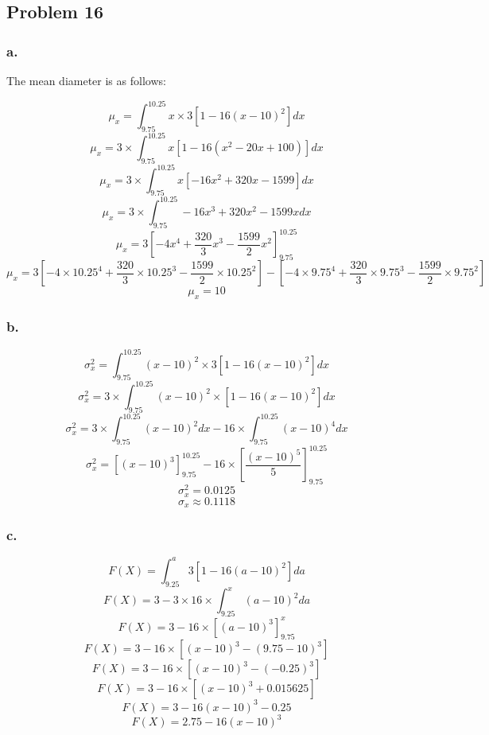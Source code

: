 \documentclass[11pt]{article}
\begin{document}
\subsection{Problem 16}
\subsubsection{a.}
The mean diameter is as follows:

\[ \mu_x = \int_{9.75}^{10.25}x \times 3\left[ 1 - 16{\left( x - 10 \right)}^2 \right]dx \]
\[ \mu_x = 3 \times \int_{9.75}^{10.25}x \left[ 1 - 16 \left(x^2 - 20x + 100 \right) \right]dx \]
\[ \mu_x = 3 \times \int_{9.75}^{10.25}x \left[ - 16x^2 + 320x - 1599 \right]dx \]
\[ \mu_x = 3 \times \int_{9.75}^{10.25}-16x^3 + 320x^2 - 1599x dx \]
\[ \mu_x = 3 {\left[ -4x^4 + \frac{320}{3}x^3 - \frac{1599}{2} x^2 \right]}^{10.25}_{9.75} \] 
\[ \mu_x = 3 \left[ -4\times 10.25^4 + \frac{320}{3}\times 10.25^3 - \frac{1599}{2} \times 10.25^2 \right] -
             \left[ -4\times 9.75^4 + \frac{320}{3}\times 9.75^3 - \frac{1599}{2} \times 9.75^2 \right]\] 
\[ \mu_x = 10 \]

\subsubsection{b.}
\[ \sigma_x^2 = \int_{9.75}^{10.25} {(x - 10)}^2 \times 3\left[ 1 - 16{(x - 10)}^2 \right]dx \]
\[ \sigma_x^2 = 3 \times \int_{9.75}^{10.25} {(x - 10)}^2 \times \left[ 1 - 16{(x - 10)}^2 \right]dx \]
\[ \sigma_x^2 = 3 \times \int_{9.75}^{10.25} {(x - 10)}^2 dx  - 16\times\int_{9.75}^{10.25} {(x - 10)}^4  dx \]
\[ \sigma_x^2 = {\left[ {(x-10)}^3 \right]}^{10.25}_{9.75}  - 16 \times {\left[\frac{{(x - 10)}^5}{5} \right]}^{10.25}_{9.75}\]
\[ \sigma_x^2 = 0.0125 \]
\[ \sigma_x \approx 0.1118 \]

\subsubsection{c.}
\[ F(X) = \int_{9.25}^{a} 3\left[ 1-16{\left( a-10 \right)}^2 \right] da \]
\[ F(X) = 3 - 3 \times 16 \times \int_{9.25}^{x} {\left( a-10 \right)}^2 da \]
\[ F(X) = 3 - 16 \times {\left[ {(a-10)}^3 \right]}^{x}_{9.75} \]
\[ F(X) = 3 - 16 \times \left[ {(x-10)}^3 - {(9.75-10)}^3 \right] \]
\[ F(X) = 3 - 16 \times \left[ {(x-10)}^3 - {(-0.25)}^3 \right] \]
\[ F(X) = 3 - 16 \times \left[ {(x-10)}^3 + 0.015625 \right] \]
\[ F(X) = 3 - 16{(x-10)}^3 - 0.25 \]
\[ F(X) = 2.75 - 16{(x-10)}^3 \]
\end{document}
